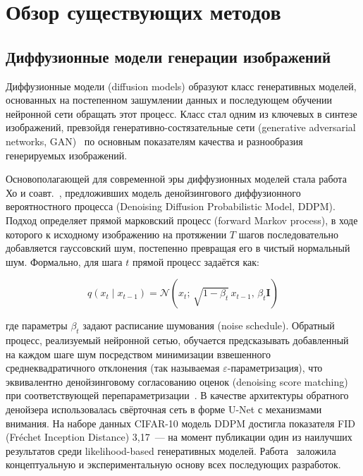 
\section{Обзор существующих методов}
\label{sec:literature_review}

\subsection{Диффузионные модели генерации изображений}

Диффузионные модели (diffusion models) образуют класс генеративных моделей, основанных на постепенном зашумлении данных и последующем обучении нейронной сети обращать этот процесс. Класс стал одним из ключевых в синтезе изображений, превзойдя генеративно-состязательные сети (generative adversarial networks, GAN)~\cite{dhariwal2021diffbeatgans} по основным показателям качества и разнообразия генерируемых изображений.

Основополагающей для современной эры диффузионных моделей стала работа Хо и соавт.~\cite{ho2020ddpm}, предложивших модель денойзингового диффузионного вероятностного процесса (Denoising Diffusion Probabilistic Model, DDPM). Подход определяет прямой марковский процесс (forward Markov process), в ходе которого к исходному изображению на протяжении $T$ шагов последовательно добавляется гауссовский шум, постепенно превращая его в чистый нормальный шум. Формально, для шага $t$ прямой процесс задаётся как:

\begin{equation}
    q(x_t \mid x_{t-1}) = \mathcal{N}(x_t;\, \sqrt{1-\beta_t}\, x_{t-1},\, \beta_t \mathbf{I})
    \label{eq:ddpm_forward}
\end{equation}

где параметры $\beta_t$ задают расписание шумования (noise schedule). Обратный процесс, реализуемый нейронной сетью, обучается предсказывать добавленный на каждом шаге шум посредством минимизации взвешенного среднеквадратичного отклонения (так называемая $\varepsilon$-параметризация), что эквивалентно денойзинговому согласованию оценок (denoising score matching) при соответствующей перепараметризации~\cite{song2021scoresde}. В качестве архитектуры обратного денойзера использовалась свёрточная сеть в форме U-Net с механизмами внимания. На наборе данных CIFAR-10 модель DDPM достигла показателя FID (Fréchet Inception Distance) 3,17~--- на момент публикации один из наилучших результатов среди likelihood-based генеративных моделей. Работа~\cite{ho2020ddpm} заложила концептуальную и экспериментальную основу всех последующих разработок.


